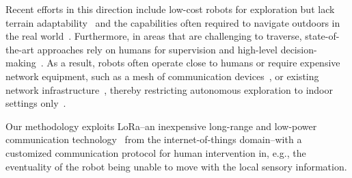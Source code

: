 \documentclass[lettersize,journal,twoside]{IEEEtran}
\theoremstyle{definition}
\begin{document}
Recent efforts in this direction include low-cost robots for exploration %
but lack terrain adaptability~\cite{muller2021openbot} and %
the capabilities often required to navigate outdoors in the real world~\cite{zhou2021smartphone,faisal2021low}. %
%
Furthermore, in areas that are %
challenging to traverse, %
state-of-the-art approaches rely on humans for supervision and high-level decision-making~\cite{tranzatto2022cerberus,roucek2020darpa,tabib2022autonomous}. 
As a result, robots often operate close to humans or require expensive network equipment, such as a mesh of communication devices~\cite{kulkarni2022autonomous,ebadi2020lamp}, or existing network infrastructure~\cite{khairuldanial2019mobile,%
voigtlander20175g}, thereby restricting autonomous exploration to indoor settings only~\cite{delgado2022oros,
cadena2016past,eldemiry2022autonomous,corah2019communication
}.

Our methodology exploits LoRa--an inexpensive long-range and low-power communication technology~\cite{shanmuga2020survey} from the internet-of-things domain--with a customized communication protocol 
for human intervention in, e.g., the eventuality of the robot being unable to move with the local sensory information. 
\end{document}
